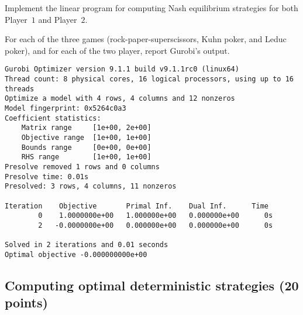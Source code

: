 \documentclass{homework}
\begin{document}
\begin{problem}[20 points]\label{prob:unconstrained strat}
    Implement the linear program for computing Nash equilibrium strategies for both Player~$1$ and Player~$2$.
    
    For each of the three games (rock-paper-superscissors, Kuhn poker, and Leduc poker), and for each of the two player, report Gurobi's output.  
\end{problem}
\begin{solution}
    \color{violet}\begin{verbatim}
Gurobi Optimizer version 9.1.1 build v9.1.1rc0 (linux64)
Thread count: 8 physical cores, 16 logical processors, using up to 16 threads
Optimize a model with 4 rows, 4 columns and 12 nonzeros
Model fingerprint: 0x5264c0a3
Coefficient statistics:
    Matrix range     [1e+00, 2e+00]
    Objective range  [1e+00, 1e+00]
    Bounds range     [0e+00, 0e+00]
    RHS range        [1e+00, 1e+00]
Presolve removed 1 rows and 0 columns
Presolve time: 0.01s
Presolved: 3 rows, 4 columns, 11 nonzeros

Iteration    Objective       Primal Inf.    Dual Inf.      Time
        0    1.0000000e+00   1.000000e+00   0.000000e+00      0s
        2   -0.0000000e+00   0.000000e+00   0.000000e+00      0s

Solved in 2 iterations and 0.01 seconds
Optimal objective -0.000000000e+00
\end{verbatim}
\end{solution}


\subsection{Computing  optimal deterministic strategies (20 points)}
\end{document}
